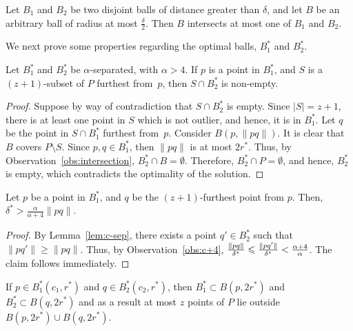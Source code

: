\documentclass[envcountsame]{cls/cccg15}
\newcommand{\card}[1]{\left|{#1}\right|}
\newcommand{\len}[1]{\|{#1}\|}
\newcommand{\lee}{\leqslant}
\newcommand{\gee}{\geqslant}
\renewcommand{\le}{\lee}
\renewcommand{\ge}{\gee}
\begin{document}
\begin{obs}
\label{obs:intersection}
	Let $B_1$ and $B_2$ be two disjoint balls of distance greater than $\delta$,
	and let $B$ be an arbitrary ball of radius at most $\frac{\delta}{2}$. 
	Then $B$ intersects at most one of $B_1$ and $B_2$.
\end{obs}

\noindent 
We next prove some properties regarding 
the optimal balls, $B_1^*$ and $B_2^*$.

\begin{lemma}
\label{lem:c-sep}
	Let $B_1^*$ and $B_2^*$ be $\alpha$-separated, with $\alpha > 4$.
	If $p$ is a point in $B_1^*$,
	and $S$ is a $(z+1)$-subset of $P$ furthest from~$p$,
	then $S \cap B_2^*$ is non-empty.
\end{lemma}

\begin{proof}
Suppose by way of contradiction that $S \cap B_2^*$ is empty. 
Since $\card{S} = z + 1$, there is at least one point in $S$
which is not outlier, and hence, it is in $B_1^*$.
Let $q$ be the point in $S \cap B_1^*$ furthest from~$p$. 
Consider $B(p, \len{pq})$. It is clear that $B$ covers $P \setminus S$. 
Since $p, q \in B_1^*$, then $\len{pq}$ is at most $2r^*$. 
Thus, by Observation~\ref{obs:intersection}, $B_2^* \cap B = \emptyset$. 
Therefore, $B_2^* \cap P = \emptyset$, and hence,
 $B_2^*$ is empty, which contradicts the optimality of the solution.
\end{proof}

\begin{lemma}
\label{lem:(z+1)-furthest}
	Let $p$ be a point in $B_1^{*}$,
	and $q$ be the $(z+1)$-furthest point from $p$. 
	Then, $\delta^* > \frac{\alpha}{\alpha+4}\len{pq}$.
\end{lemma}

\begin{proof}
By Lemma~\ref{lem:c-sep}, there exists a point $q' \in B_2^*$ 
such that $\len{pq'} \ge \len{pq}$. 
Thus, by Observation~\ref{obs:c+4}, 
${\len{pq} \over \delta^*} \le {\len{pq'} \over \delta^*} < \frac{\alpha+4}{\alpha}$.
The claim follows immediately.
\end{proof}

\begin{lemma}
\label{lem:2r}
	If $p \in B_1^*(c_1, r^*)$ and $q \in B_2^*(c_2, r^*)$,
	then $B_1^* \subset B(p, 2r^*)$ and $B_2^* \subset B(q, 2r^*)$ and as a result at most $z$ points of $P$ lie outside $B(p, 2r^*) \cup B(q, 2r^*)$.
\end{lemma}
\end{document}
